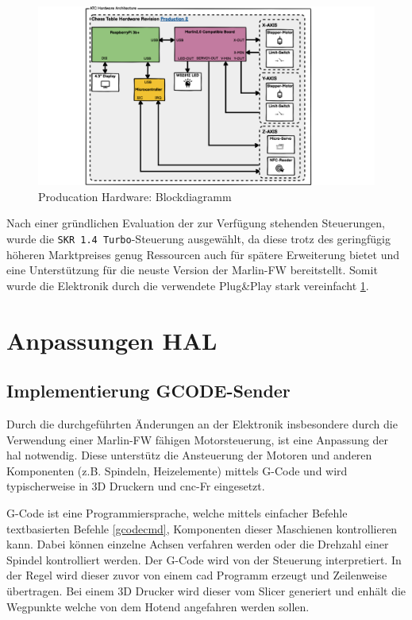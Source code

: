\begin{figure}
\centering
\includegraphics{images/ATC_Hardware_Architecture_PROD.png}
\caption{Producation Hardware: Blockdiagramm
\label{ATC_Hardware_Architecture_PROD}}
\end{figure}

Nach einer gründlichen Evaluation der zur Verfügung stehenden
Steuerungen, wurde die \passthrough{\lstinline!SKR 1.4 Turbo!}-Steuerung
ausgewählt, da diese trotz des geringfügig höheren Marktpreises genug
Ressourcen auch für spätere Erweiterung bietet und eine Unterstützung
für die neuste Version der Marlin-FW\cite{marlinfw} bereitstellt.
Somit wurde die Elektronik durch die verwendete Plug\&Play stark
vereinfacht \ref{ATC_Hardware_Architecture_PROD}.

\hypertarget{anpassungen-hal}{%
\section{Anpassungen HAL}\label{anpassungen-hal}}

\hypertarget{implementierung-gcode-sender}{%
\subsection{Implementierung
GCODE-Sender}\label{implementierung-gcode-sender}}

Durch die durchgeführten Änderungen an der Elektronik insbesondere durch
die Verwendung einer Marlin-FW\cite{marlinfw} fähigen
Motorsteuerung, ist eine Anpassung der \gls{hal} notwendig. Diese
unterstütz die Ansteuerung der Motoren und anderen Komponenten (z.B.
Spindeln, Heizelemente) mittels G-Code und wird typischerweise in 3D
Druckern und \gls{cnc}-Fr eingesetzt.

G-Code ist eine Programmiersprache, welche mittels einfacher Befehle
textbasierten Befehle \ref{gcodecmd}, Komponenten dieser Maschienen
kontrollieren kann. Dabei können einzelne Achsen verfahren werden oder
die Drehzahl einer Spindel kontrolliert werden. Der G-Code wird von der
Steuerung interpretiert. In der Regel wird dieser zuvor von einem
\gls{cad} Programm erzeugt und Zeilenweise übertragen. Bei einem 3D
Drucker wird dieser vom Slicer generiert und enhält die Wegpunkte welche
von dem Hotend angefahren werden sollen.


